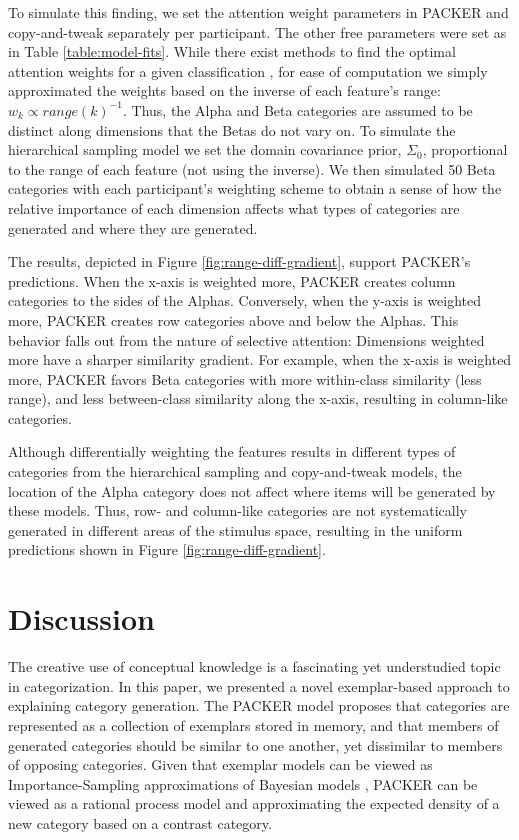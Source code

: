 \documentclass[10pt,letterpaper]{article}
\begin{document}
To simulate this finding, we set the attention weight parameters in PACKER and copy-and-tweak separately per participant. The other free parameters were set as in Table \ref{table:model-fits}. While there exist methods to find the optimal attention weights for a given classification \citep[see][]{vanpaemel2012using}, for ease of computation we simply approximated the weights based on the inverse of each feature's range: $w_k \propto range(k)^{-1}$. Thus, the Alpha and Beta categories are assumed to be distinct along dimensions that the Betas do not vary on. To simulate the hierarchical sampling model we set the domain covariance prior, $\Sigma_0$, proportional to the range of each feature (not using the inverse). We then simulated 50 Beta categories with each participant's weighting scheme to obtain a sense of how the relative importance of each dimension affects what types of categories are generated and where they are generated. 

The results, depicted in Figure \ref{fig:range-diff-gradient}, support PACKER's predictions. When the x-axis is weighted more, PACKER creates column categories to the sides of the Alphas. Conversely, when the y-axis is weighted more, PACKER creates row categories above and below the Alphas. This behavior falls out from the nature of selective attention: Dimensions weighted more have a sharper similarity gradient. For example, when the x-axis is weighted more, PACKER favors Beta categories with more within-class similarity (less range), and less between-class similarity along the x-axis, resulting in column-like categories.

Although differentially weighting the features results in different types of categories from the hierarchical sampling and copy-and-tweak models, the location of the Alpha category does not affect where items will be generated by these models. Thus, row- and column-like categories are not systematically generated in different areas of the stimulus space, resulting in the uniform predictions shown in Figure \ref{fig:range-diff-gradient}.

\section{Discussion}
The creative use of conceptual knowledge is a fascinating yet understudied topic in categorization. In this paper, we presented a novel exemplar-based approach to explaining category generation. The PACKER model proposes that categories are represented as a collection of exemplars stored in memory, and that members of generated categories should be similar to one another, yet dissimilar to members of opposing categories. Given that exemplar models can be viewed as Importance-Sampling approximations of Bayesian models \citep{shi10}, PACKER can be viewed as a rational process model and approximating the expected density of a new category based on a contrast category. 
\end{document}
